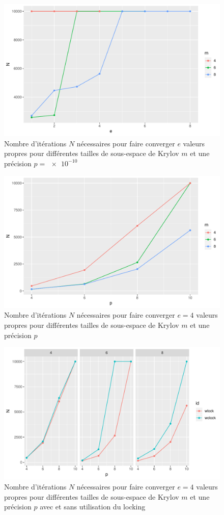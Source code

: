 \documentclass[11pt,a4paper]{article}
\begin{document}
\begin{figure}
	\centering
	\includegraphics[width=0.8\linewidth, keepaspectratio]{plots/Nvse-m_p10.pdf}
	\caption{Nombre d'itérations $N$ nécessaires pour faire converger $e$ valeurs propres pour différentes tailles de sous-espace de Krylov $m$ et une précision $p=\SI{e-10}{}$ \label{fig:Nvse-m_p10}}
\end{figure}

\begin{figure}
	\centering
	\includegraphics[width=0.8\linewidth, keepaspectratio]{plots/Nvsp-m_e4.pdf}
	\caption{Nombre d'itérations $N$ nécessaires pour faire converger $e = 4$ valeurs propres pour différentes tailles de sous-espace de Krylov $m$ et une précision $p$ \label{fig:Nvsp-m_e4}}
\end{figure}

\begin{figure}
	\centering
	\includegraphics[width=0.8\linewidth, keepaspectratio]{plots/Nvsp_complock.pdf}
	\caption{Nombre d'itérations $N$ nécessaires pour faire converger $e = 4$ valeurs propres pour différentes tailles de sous-espace de Krylov $m$ et une précision $p$ avec et sans utilisation du locking \label{fig:Nvsp_complock}}
\end{figure}
\end{document}
